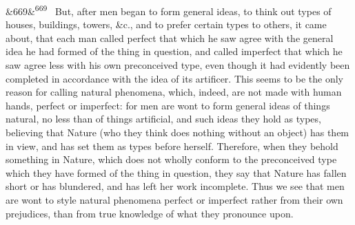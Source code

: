 \documentclass[12pt]{article}
\newcommand{\para}[1][]{\par\noindent\ifx&#1&\else\textsuperscript{\footnotesize #1}~\fi}
\begin{document}
\para[669] But, after men began to form general ideas, to think out types of houses, buildings, towers, \&c., and to prefer certain types to others, it came about, that each man called perfect that which he saw agree with the general idea he had formed of the thing in question, and called imperfect that which he saw agree less with his own preconceived type, even though it had evidently been completed in accordance with the idea of its artificer. This seems to be the only reason for calling natural phenomena, which, indeed, are not made with human hands, perfect or imperfect: for men are wont to form general ideas of things natural, no less than of things artificial, and such ideas they hold as types, believing that Nature (who they think does nothing without an object) has them in view, and has set them as types before herself. Therefore, when they behold something in Nature, which does not wholly conform to the preconceived type which they have formed of the thing in question, they say that Nature has fallen short or has blundered, and has left her work incomplete. Thus we see that men are wont to style natural phenomena perfect or imperfect rather from their own prejudices, than from true knowledge of what they pronounce upon.
\end{document}

